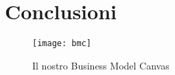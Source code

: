 \chapter{Conclusioni}
\label{chap:conc}

\begin{figure}[htpb!]
  \centering
  \texttt{[image: bmc]}
  \caption{Il nostro Business Model Canvas}
  \label{fig:traffico}
\end{figure}
